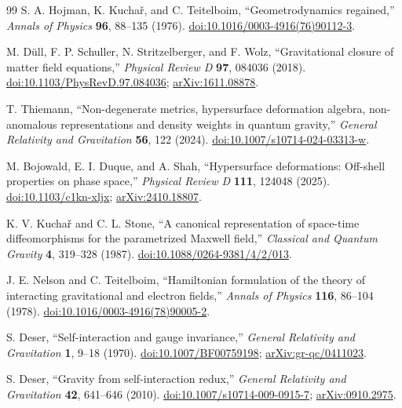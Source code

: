 \documentclass[11pt]{article}
\begin{document}
\begin{thebibliography}{99}
S. A. Hojman, K. Kucha\v{r}, and C. Teitelboim,
``Geometrodynamics regained,''
\emph{Annals of Physics} \textbf{96}, 88--135 (1976).
\href{https://doi.org/10.1016/0003-4916(76)90112-3}{doi:10.1016/0003-4916(76)90112-3}.

M. D\"ull, F. P. Schuller, N. Stritzelberger, and F. Wolz,
``Gravitational closure of matter field equations,''
\emph{Physical Review D} \textbf{97}, 084036 (2018).
\href{https://doi.org/10.1103/PhysRevD.97.084036}{doi:10.1103/PhysRevD.97.084036};
\href{https://arxiv.org/abs/1611.08878}{arXiv:1611.08878}.

T. Thiemann,
``Non-degenerate metrics, hypersurface deformation algebra, non-anomalous representations and density weights in quantum gravity,''
\emph{General Relativity and Gravitation} \textbf{56}, 122 (2024).
\href{https://doi.org/10.1007/s10714-024-03313-w}{doi:10.1007/s10714-024-03313-w}.

M. Bojowald, E. I. Duque, and A. Shah,
``Hypersurface deformations: Off-shell properties on phase space,''
\emph{Physical Review D} \textbf{111}, 124048 (2025).
\href{https://doi.org/10.1103/c1kn-xljx}{doi:10.1103/c1kn-xljx};
\href{https://arxiv.org/abs/2410.18807}{arXiv:2410.18807}.

K. V. Kucha\v{r} and C. L. Stone,
``A canonical representation of space-time diffeomorphisms for the parametrized Maxwell field,''
\emph{Classical and Quantum Gravity} \textbf{4}, 319--328 (1987).
\href{https://doi.org/10.1088/0264-9381/4/2/013}{doi:10.1088/0264-9381/4/2/013}.

J. E. Nelson and C. Teitelboim,
``Hamiltonian formulation of the theory of interacting gravitational and electron fields,''
\emph{Annals of Physics} \textbf{116}, 86--104 (1978).
\href{https://doi.org/10.1016/0003-4916(78)90005-2}{doi:10.1016/0003-4916(78)90005-2}.

S. Deser,
``Self-interaction and gauge invariance,''
\emph{General Relativity and Gravitation} \textbf{1}, 9--18 (1970).
\href{https://doi.org/10.1007/BF00759198}{doi:10.1007/BF00759198};
\href{https://arxiv.org/abs/gr-qc/0411023}{arXiv:gr-qc/0411023}.

S. Deser,
``Gravity from self-interaction redux,''
\emph{General Relativity and Gravitation} \textbf{42}, 641--646 (2010).
\href{https://doi.org/10.1007/s10714-009-0915-7}{doi:10.1007/s10714-009-0915-7};
\href{https://arxiv.org/abs/0910.2975}{arXiv:0910.2975}.


\end{thebibliography}
\end{document}
